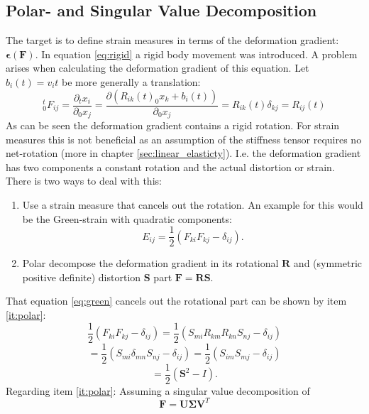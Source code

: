 \documentclass[m,times]{cgMA}
\begin{document}
\subsection{Polar- and Singular Value Decomposition}\label{sec:svd}
The target is to define strain measures in terms of the deformation gradient: $\boldsymbol{\epsilon}(\boldsymbol{F})$. In equation \ref{eq:rigid} a rigid body movement was introduced. A problem arises when calculating the deformation gradient of this equation.
Let $b_i(t) = v_it$ be more generally a translation:
\begin{equation}
  ^t_0F_{ij} = \frac{\partial{_tx_i}}{\partial_0x_j} = \frac{\partial (R_{ik}(t)_0x_k+b_i(t))}{\partial _0x_j} = R_{ik}(t) \delta_{kj} = R_{ij}(t)
\end{equation}
As can be seen the deformation gradient contains a rigid rotation. For strain measures this is not beneficial as an assumption of the stiffness tensor requires no net-rotation (more in chapter \ref{sec:linear_elasticty}). I.e. the deformation gradient has two components a constant rotation and the actual distortion or strain. There is two ways to deal with this:
\begin{enumerate}
  \item  Use a strain measure that cancels out the rotation. An example for this would be the Green-strain with quadratic components:
    \begin{equation}\label{eq:green}
      E _ { i j } = \frac { 1 } { 2 } \left( F _ { k i } F _ { k j } - \delta _ { i j } \right).
    \end{equation}
  \item \label{it:polar} Polar decompose the deformation gradient in its rotational $\boldsymbol{R}$ and (symmetric positive definite) distortion $\boldsymbol{S}$ part $\boldsymbol{F}=\boldsymbol{R}\boldsymbol{S}$.
\end{enumerate}
That equation \ref{eq:green} cancels out the rotational part can be shown by item \ref{it:polar}:
$$ \frac { 1 } { 2 } \left( F _ { k i } F _ { k j } - \delta _ { i j } \right) = \frac { 1 } { 2 } \left( S _ {m i}R_{k m} R _ { k n} S_{n j} - \delta _ { i j } \right)$$
$$= \frac { 1 } { 2 } \left( S _ {m i} \delta_{mn} S_{n j} - \delta _ { i j } \right) = \frac { 1 } { 2 } \left( S _ {i m} S_{m j} - \delta _ { i j } \right)$$
$$= \frac{1}{2} \left(\boldsymbol{S}^2 - I \right).$$
Regarding item \ref{it:polar}: Assuming a singular value decomposition of
\begin{equation}\label{eq:svd}
  \boldsymbol{F} = \boldsymbol{U\Sigma V}^T
\end{equation}
\end{document}
